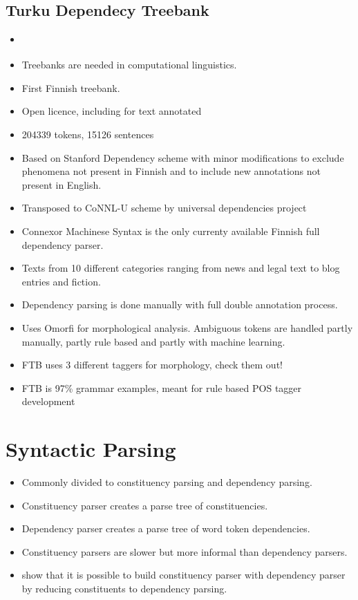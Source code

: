 \documentclass[12pt,a4paper,english
]{tutthesis}
\begin{document}
\subsection{Turku Dependecy Treebank}
\begin{itemize}
\item \cite{Haverinen2014}
\item Treebanks are needed in computational linguistics.
\item First Finnish treebank.
\item Open licence, including for text annotated
\item 204339 tokens, 15126 sentences
\item Based on Stanford Dependency scheme with minor modifications to exclude phenomena not present in Finnish and to include new annotations not present in English.
\item Transposed to CoNNL-U scheme by universal dependencies project
\item Connexor Machinese Syntax is the only currenty available Finnish full dependency parser.
\item Texts from 10 different categories ranging from news and legal text to blog entries and fiction.
\item Dependency parsing is done manually with full double annotation process.
\item Uses Omorfi for morphological analysis. Ambiguous tokens are handled partly manually, partly rule based and partly with machine learning.
\item FTB uses 3 different taggers for morphology, check them out!
\item FTB is 97\% grammar examples, meant for rule based POS tagger development
\end{itemize}

\section{Syntactic Parsing}
\label{se:syntactic_parsing}
\begin{itemize}
\item Commonly divided to constituency parsing and dependency parsing.
\item Constituency parser creates a parse tree of constituencies.
\item Dependency parser creates a parse tree of word token dependencies.
\item Constituency parsers are slower but more informal than dependency parsers. \cite{Fernandez-Gonzalez2015}
\item \cite{Fernandez-Gonzalez2015} show that it is possible to build constituency parser with dependency parser by reducing constituents to dependency parsing.
\end{itemize}
\end{document}

